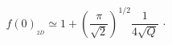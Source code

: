 \begin{equation}
f(0)_{_{2D}}\simeq 1+\left( \frac{\pi }{\sqrt{2}}\right)
^{1/2}\frac{1}{4 \sqrt{Q}}\,\cdot
\end{equation}

